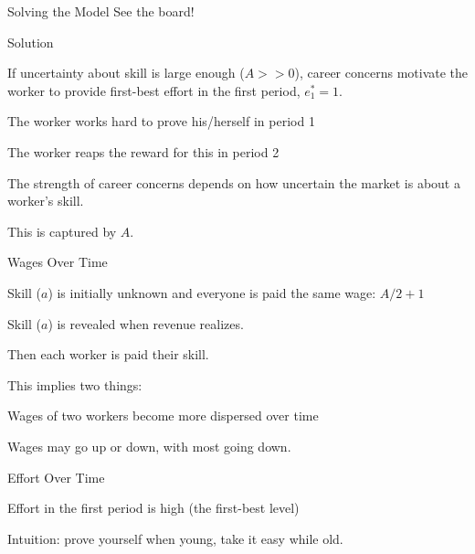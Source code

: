 \documentclass[aspectratio=169,usenames,dvipsnames]{beamer}
\newenvironment{wideitemize}{\itemize\addtolength{\itemsep}{10pt}}{\enditemize}
\begin{document}
\begin{frame}{Solving the Model}
\centering
    \huge See the board!

\end{frame}

\begin{frame}{Solution}

\begin{theorem}
    If uncertainty about skill is large enough ($A>>0$), career concerns motivate the worker to provide first-best effort in the first period, $e_1^*=1$.
\end{theorem}
    \begin{wideitemize}
        \item The worker works hard to prove his/herself in period 1
        \item The worker reaps the reward for this in period 2
        \item The strength of career concerns depends on how uncertain the market is about a worker's skill.
        \item This is captured by $A$.
    \end{wideitemize}
\end{frame}

\begin{frame}{Wages Over Time}

\begin{wideitemize}
    \item Skill ($a$) is initially unknown and everyone is paid the same wage: $A/2+1$
    \item Skill ($a$) is revealed when revenue realizes.
    \item Then each worker is paid their skill.
    \item This implies two things:
    \begin{wideitemize}
        \item Wages of two workers become more dispersed over time
        \item Wages may go up or down, with most going down.
    \end{wideitemize}
\end{wideitemize}
    
\end{frame}

\begin{frame}{Effort Over Time}

\begin{wideitemize}
    \item Effort in the first period is high (the first-best level)
    \item Intuition: prove yourself when young, take it easy while old.
\end{wideitemize}
    
\end{frame}
\end{document}
